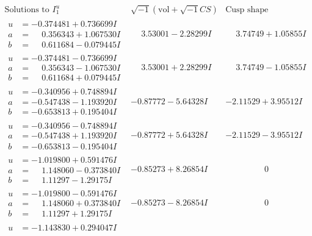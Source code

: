 \documentclass[1p]{elsarticle_modified}
\theoremstyle{definition}
\newcommand{\I}{\sqrt{-1}}
\begin{document}
$$\begin{array}{c|c|c}
\text{Solutions to }I^u_{1}& \I (\text{vol} + \sqrt{-1}CS) & \text{Cusp shape}\\
 \hline 
\begin{aligned}
u &= -0.374481 + 0.736699 I \\
a &= \phantom{-}0.356343 + 1.067530 I \\
b &= \phantom{-}0.611684 - 0.079445 I\end{aligned}
 & \phantom{-}3.53001 - 2.28299 I & \phantom{-}3.74749 + 1.05855 I \\ \hline\begin{aligned}
u &= -0.374481 - 0.736699 I \\
a &= \phantom{-}0.356343 - 1.067530 I \\
b &= \phantom{-}0.611684 + 0.079445 I\end{aligned}
 & \phantom{-}3.53001 + 2.28299 I & \phantom{-}3.74749 - 1.05855 I \\ \hline\begin{aligned}
u &= -0.340956 + 0.748894 I \\
a &= -0.547438 - 1.193920 I \\
b &= -0.653813 + 0.195404 I\end{aligned}
 & -0.87772 - 5.64328 I & -2.11529 + 3.95512 I \\ \hline\begin{aligned}
u &= -0.340956 - 0.748894 I \\
a &= -0.547438 + 1.193920 I \\
b &= -0.653813 - 0.195404 I\end{aligned}
 & -0.87772 + 5.64328 I & -2.11529 - 3.95512 I \\ \hline\begin{aligned}
u &= -1.019800 + 0.591476 I \\
a &= \phantom{-}1.148060 - 0.373840 I \\
b &= \phantom{-}1.11297 - 1.29175 I\end{aligned}
 & -0.85273 + 8.26854 I & \phantom{-0.000000 } 0 \\ \hline\begin{aligned}
u &= -1.019800 - 0.591476 I \\
a &= \phantom{-}1.148060 + 0.373840 I \\
b &= \phantom{-}1.11297 + 1.29175 I\end{aligned}
 & -0.85273 - 8.26854 I & \phantom{-0.000000 } 0 \\ \hline\begin{aligned}
u &= -1.143830 + 0.294047 I \\

\end{aligned}
\end{array}$$
\end{document}
